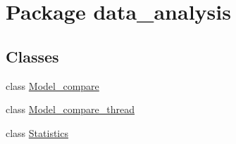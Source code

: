 \hypertarget{namespacedata__analysis}{}\section{Package data\+\_\+analysis}
\label{namespacedata__analysis}
\subsection*{Classes}
\begin{DoxyCompactItemize}
\item 
class \hyperlink{classdata__analysis_1_1_model__compare}{Model\+\_\+compare}
\item 
class \hyperlink{classdata__analysis_1_1_model__compare__thread}{Model\+\_\+compare\+\_\+thread}
\item 
class \hyperlink{classdata__analysis_1_1_statistics}{Statistics}
\end{DoxyCompactItemize}
